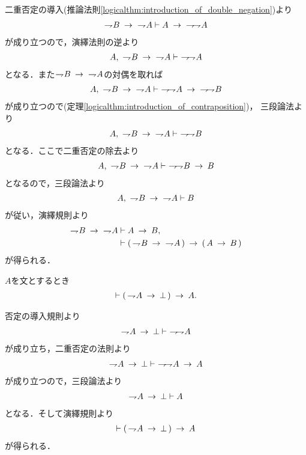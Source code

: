 	\begin{prf}
		二重否定の導入(推論法則\ref{logicalthm:introduction_of_double_negation})より
		\begin{align}
			\negation B \rarrow\ \negation A \vdash 
			A \rarrow\ \negation \negation A
		\end{align}
		が成り立つので，演繹法則の逆より
		\begin{align}
			A,\ \negation B \rarrow\ \negation A \vdash\ \negation \negation A
		\end{align}
		となる．また$\negation B \rarrow\ \negation A$の対偶を取れば
		\begin{align}
			A,\ \negation B \rarrow\ \negation A \vdash\ 
			\negation \negation A \rarrow\ \negation \negation B
		\end{align}
		が成り立つので(定理\ref{logicalthm:introduction_of_contraposition})，
		三段論法より
		\begin{align}
			A,\ \negation B \rarrow\ \negation A \vdash\ \negation \negation B
		\end{align}
		となる．ここで二重否定の除去より
		\begin{align}
			A,\ \negation B \rarrow\ \negation A \vdash\ 
			\negation \negation B \rarrow B
		\end{align}
		となるので，三段論法より
		\begin{align}
			A,\ \negation B \rarrow\ \negation A \vdash B
		\end{align}
		が従い，演繹規則より
		\begin{align}
			\negation B \rarrow\ \negation A &\vdash A \rarrow B, \\
			&\vdash (\, \negation B \rarrow\ \negation A\, ) 
			\rarrow (\, A \rarrow B\, )
		\end{align}
		が得られる．
		\QED
	\end{prf}
	
	\begin{screen}
		\begin{logicalthm}[背理法の原理]
		\label{logicalthm:proof_by_contradiction}
			$A$を文とするとき
			\begin{align}
				\vdash (\, \negation A \rarrow \bot\, ) \rarrow A.
			\end{align}
		\end{logicalthm}
	\end{screen}
	
	\begin{prf}
		否定の導入規則より
		\begin{align}
			\negation A \rarrow \bot \vdash\ \negation \negation A
		\end{align}
		が成り立ち，二重否定の法則より
		\begin{align}
			\negation A \rarrow \bot \vdash\ \negation \negation A \rarrow A
		\end{align}
		が成り立つので，三段論法より
		\begin{align}
			\negation A \rarrow \bot \vdash A
		\end{align}
		となる．そして演繹規則より
		\begin{align}
			\vdash (\, \negation A \rarrow \bot\, ) \rarrow A
		\end{align}
		が得られる．
		\QED
	\end{prf}
	
